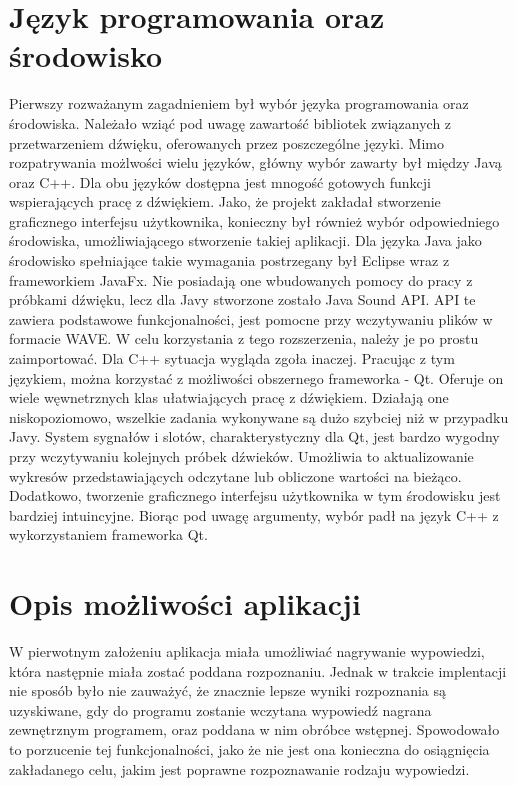 \documentclass[a4paper,12 pt]{report}
\begin{document}
\section{Język programowania oraz środowisko}
Pierwszy rozważanym zagadnieniem był wybór języka programowania oraz środowiska. Należało wziąć pod uwagę zawartość bibliotek związanych z przetwarzeniem dźwięku, oferowanych przez poszczególne języki.
Mimo rozpatrywania możlwości wielu języków, główny wybór zawarty był między Javą oraz C++. Dla obu języków dostępna jest mnogość gotowych funkcji wspierających pracę z dźwiękiem. Jako, że projekt zakładał stworzenie graficznego interfejsu użytkownika, 
konieczny był również wybór odpowiedniego środowiska, umożliwiającego stworzenie takiej aplikacji. Dla języka Java jako środowisko spełniające takie wymagania postrzegany był Eclipse wraz z frameworkiem JavaFx. Nie posiadają one wbudowanych pomocy do pracy z próbkami dźwięku, lecz dla Javy stworzone zostało
Java Sound API. API te zawiera podstawowe funkcjonalności, jest pomocne przy wczytywaniu plików w formacie WAVE. W celu korzystania z tego rozszerzenia, należy je po prostu zaimportować. Dla  C++ sytuacja wygląda zgoła inaczej. Pracując z tym językiem, można korzystać z możliwości obszernego frameworka - Qt. Oferuje on wiele węwnetrznych klas ułatwiających pracę z dźwiękiem. Działają one niskopoziomowo, wszelkie zadania wykonywane są dużo szybciej niż w przypadku Javy.  System sygnałów i slotów, charakterystyczny dla Qt, jest bardzo wygodny przy wczytywaniu kolejnych próbek dźwieków. Umożliwia to aktualizowanie wykresów przedstawiających odczytane lub obliczone wartości na bieżąco. Dodatkowo, tworzenie graficznego interfejsu użytkownika w tym środowisku jest bardziej intuincyjne. Biorąc pod uwagę argumenty, wybór padł na język C++ z wykorzystaniem frameworka Qt.

\section{Opis możliwości aplikacji}
W pierwotnym założeniu aplikacja miała umożliwiać nagrywanie wypowiedzi, która następnie miała zostać poddana rozpoznaniu. Jednak w trakcie implentacji nie sposób było nie zauważyć, że znacznie lepsze wyniki rozpoznania są uzyskiwane, gdy do programu zostanie wczytana wypowiedź nagrana zewnętrznym programem, oraz poddana w nim obróbce wstępnej. Spowodowało to porzucenie tej funkcjonalności, jako że nie jest ona konieczna do osiągnięcia zakładanego celu, jakim jest poprawne rozpoznawanie rodzaju wypowiedzi.
\end{document}
